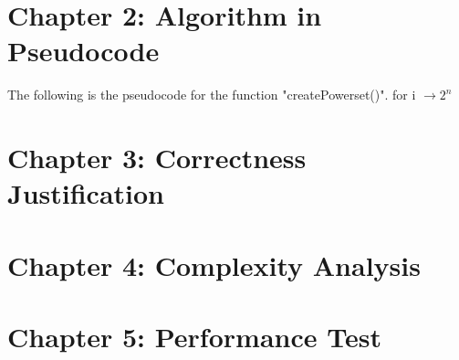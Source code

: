 \documentclass{article}
\begin{document}
\section*{Chapter 2: Algorithm in Pseudocode}

\noindent The following is the pseudocode for the function "createPowerset()". \newline
for i $\rightarrow 2^n$




\section*{Chapter 3: Correctness Justification}

\section*{Chapter 4: Complexity Analysis}

\section*{Chapter 5: Performance Test}
\end{document}
